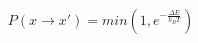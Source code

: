 \begin{equation}
\label{equation:metropolis_acceptance}
P(x \rightarrow x') = min\left(1,e^{-\frac{{\Delta}E}{k_{B}T}}\right)
\end{equation}
